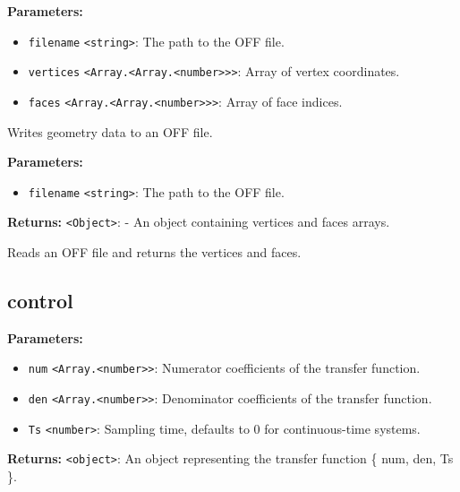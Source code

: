 \documentclass[12pt,a4paper]{article}
\begin{document}
\noindent \textbf{Parameters:}
\begin{itemize}
  \item \texttt{filename} \texttt{<string>}: The path to the OFF file.
  \item \texttt{vertices} \texttt{<Array.<Array.<number>>>}: Array of vertex coordinates.
  \item \texttt{faces} \texttt{<Array.<Array.<number>>>}: Array of face indices.
\end{itemize}

\noindent Writes geometry data to an OFF file.

\vspace{5mm}
\noindent {}


\noindent \textbf{Parameters:}
\begin{itemize}
  \item \texttt{filename} \texttt{<string>}: The path to the OFF file.
\end{itemize}

\noindent \textbf{Returns:} \texttt{<Object>}: - An object containing vertices and faces arrays.

\noindent Reads an OFF file and returns the vertices and faces.


\subsection{control}
\vspace{5mm}
\noindent {}


\noindent \textbf{Parameters:}
\begin{itemize}
  \item \texttt{num} \texttt{<Array.<number>>}: Numerator coefficients of the transfer function.
  \item \texttt{den} \texttt{<Array.<number>>}: Denominator coefficients of the transfer function.
  \item \texttt{Ts} \texttt{<number>}: Sampling time, defaults to 0 for continuous-time systems.
\end{itemize}

\noindent \textbf{Returns:} \texttt{<object>}: An object representing the transfer function \{ num, den, Ts \}.
\end{document}
